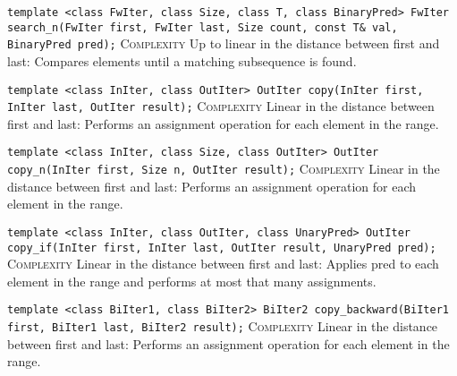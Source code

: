 \noindent{}\hspace*{0.25em}\lstinline[basicstyle=\ttfamily\color{corange}]{template <class FwIter, class Size, class T, class BinaryPred> FwIter search_n(FwIter first, FwIter last, Size count, const T& val, BinaryPred pred);} \textsc{Complexity} Up to linear in the distance between first and last: Compares elements until a matching subsequence is found.\\\vspace{-0.6em}

\noindent{}\hspace*{0.25em}\lstinline[basicstyle=\ttfamily\color{corange}]{template <class InIter, class OutIter> OutIter copy(InIter first, InIter last, OutIter result);} \textsc{Complexity} Linear in the distance between first and last: Performs an assignment operation for each element in the range.\\\vspace{-0.6em}

\noindent{}\hspace*{0.25em}\lstinline[basicstyle=\ttfamily\color{corange}]{template <class InIter, class Size, class OutIter> OutIter copy_n(InIter first, Size n, OutIter result);} \textsc{Complexity} Linear in the distance between first and last: Performs an assignment operation for each element in the range.\\\vspace{-0.6em}

\noindent{}\hspace*{0.25em}\lstinline[basicstyle=\ttfamily\color{corange}]{template <class InIter, class OutIter, class UnaryPred> OutIter copy_if(InIter first, InIter last, OutIter result, UnaryPred pred);} \textsc{Complexity} Linear in the distance between first and last: Applies pred to each element in the range and performs at most that many assignments.\\\vspace{-0.6em}

\noindent{}\hspace*{0.25em}\lstinline[basicstyle=\ttfamily\color{corange}]{template <class BiIter1, class BiIter2> BiIter2 copy_backward(BiIter1 first, BiIter1 last, BiIter2 result);} \textsc{Complexity} Linear in the distance between first and last: Performs an assignment operation for each element in the range.\\\vspace{-0.6em}

